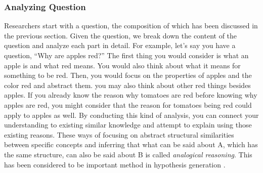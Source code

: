 \documentclass{article}
\begin{document}



\subsubsection{Analyzing Question}
Researchers start with a question, the composition of which has been discussed in the previous section. Given the question, we break down the content of the question and analyze each part in detail. For example, let's say you have a question, ``Why are apples red?'' The first thing you would consider is what an apple is and what red means. You would also think about what it means for something to be red. Then, you would focus on the properties of apples and the color red and abstract them. you may also think about other red things besides apples. If you already know the reason why tomatoes are red before knowing why apples are red, you might consider that the reason for tomatoes being red could apply to apples as well. By conducting this kind of analysis, you can connect your understanding to existing similar knowledge and attempt to explain using those existing reasons. These ways of focusing on abstract structural similarities between specific concepts and inferring that what can be said about A, which has the same structure, can also be said about B is called \textit{analogical reasoning}. This has been considered to be important method in hypothesis generation \cite{hesse1965models,thagard_1984,gentner1993shift,holyoak1996mental,dunbar1997scientists}.
\end{document}
